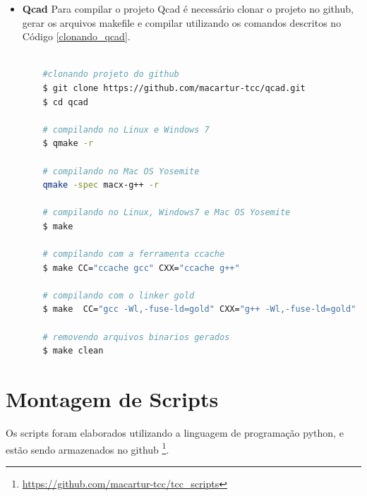 \begin{itemize}
\begin{lstlisting}[language=bash, caption={Clonado Projeto Aseprite e criando diretório de Compilação},
                  label=clonando_aseprite]
    # compilando projeto com ccache no Mac OS Yosemite
    $ cmake -G .. "Unix Makefiles"  -DCMAKE_CXX_COMPILER="ccache"  -DCMAKE_CXX_COMPILER_ARG1="g++" -DCMAKE_C_COMPILER="ccache" -DCMAKE_C_COMPILER_ARG1="gcc"  -DCMAKE_OSX_ARCHITECTURES:STRING=i386  -DCMAKE_OSX_DEPLOYMENT_TARGET:STRING=10.4  -DCMAKE_OSX_SYSROOT:STRING=/SDKs/MacOSX10.4u.sdk

    # compilando com o linker gold no Linux
    $ CC="gcc  -Wl,-fuse-ld=gold" CXX="g++ -Wl,-fuse-ld=gold" cmake .. -G "Unix Makefiles"

    # removendo arquivos binarios
    $ make clean

\end{lstlisting}


    \item \textbf{Qcad}
    \subitem Para compilar o projeto Qcad é necessário clonar o
 projeto no github, gerar os arquivos makefile e compilar
 utilizando os comandos descritos no Código \ref{clonando_qcad}.

\begin{lstlisting}[language=bash, caption={Clonado Projeto Qcad},
                  label=clonando_qcad]

    #clonando projeto do github
    $ git clone https://github.com/macartur-tcc/qcad.git
    $ cd qcad

    # compilando no Linux e Windows 7
    $ qmake -r
    
    # compilando no Mac OS Yosemite
    qmake -spec macx-g++ -r

    # compilando no Linux, Windows7 e Mac OS Yosemite
    $ make

    # compilando com a ferramenta ccache
    $ make CC="ccache gcc" CXX="ccache g++"

    # compilando com o linker gold
    $ make  CC="gcc -Wl,-fuse-ld=gold" CXX="g++ -Wl,-fuse-ld=gold"

    # removendo arquivos binarios gerados
    $ make clean

\end{lstlisting}
\end{itemize}


\section{Montagem de Scripts}


Os scripts foram elaborados utilizando a linguagem de programação python,
 e estão sendo armazenados no github
\footnote{\url{https://github.com/macartur-tcc/tcc_scripts}}.


